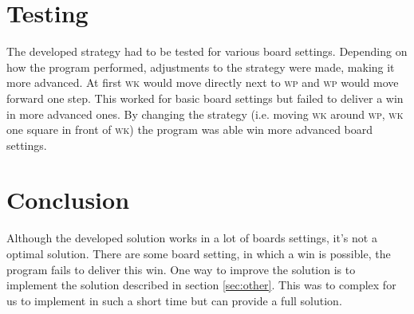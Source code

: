 \documentclass[titlepage,a4paper, 11pt]{article}
\newcommand{\wk}{\textsc{wk}\xspace}
\renewcommand{\wp}{\textsc{wp}\xspace}
\begin{document}
\section{Testing}
The developed strategy had to be tested for various board settings. Depending on how the program performed, adjustments to the strategy were made, making it more advanced. At first \wk would move directly next to \wp and \wp would move forward one step. This worked for basic board settings but failed to deliver a win in more advanced ones. By changing the strategy (i.e. moving \wk around \wp, \wk one square in front of \wk) the program was able win more advanced board settings.

\section{Conclusion}
Although the developed solution works in a lot of boards settings, it's not a optimal solution. There are some board setting, in which a win is possible, the program fails to deliver this win. One way to improve the solution is to implement the solution described in section \ref{sec:other}. This was to complex for us to implement in such a short time but can provide a full solution.
\end{document}
